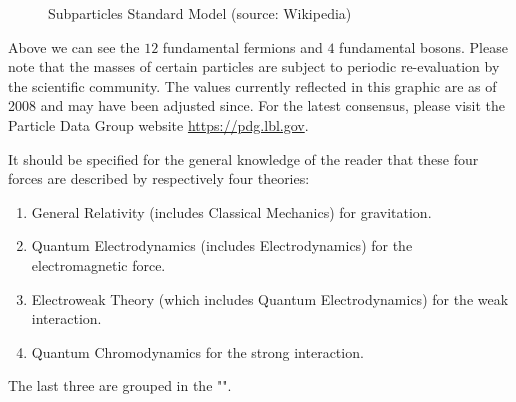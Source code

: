\begin{figure}[H]
		\caption[Subparticles Standard Model]{Subparticles Standard Model (source: Wikipedia)}
	\end{figure}
	Above we can see the $12$ fundamental fermions and $4$ fundamental bosons. Please note that the masses of certain particles are subject to periodic re-evaluation by the scientific community. The values currently reflected in this graphic are as of 2008 and may have been adjusted since. For the latest consensus, please visit the Particle Data Group website \url{https://pdg.lbl.gov}.
	
	It should be specified for the general knowledge of the reader that these four forces are described by respectively four theories:
	\begin{enumerate}
		\item General Relativity (includes Classical Mechanics) for gravitation.

		\item Quantum Electrodynamics (includes Electrodynamics) for the electromagnetic force.

		\item Electroweak Theory (which includes Quantum Electrodynamics) for the weak interaction.

		\item Quantum Chromodynamics for the strong interaction.
	\end{enumerate}
	The last three are grouped in the "".
	
